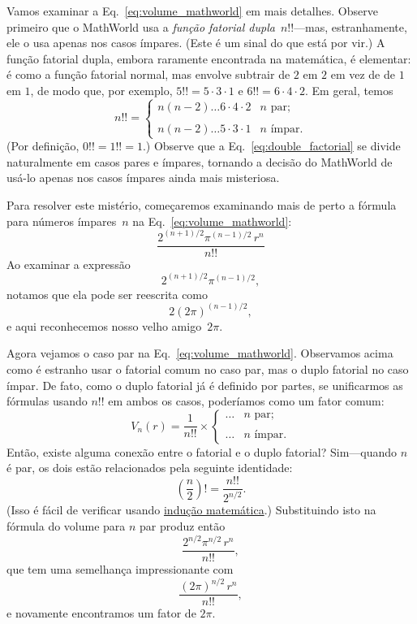 Vamos examinar a Eq.~\eqref{eq:volume_mathworld} em mais detalhes. Observe primeiro que o MathWorld usa a \emph{função fatorial dupla}~$n!!$---mas, estranhamente, ele o usa apenas nos casos ímpares. (Este é um sinal do que está por vir.) A função fatorial dupla, embora raramente encontrada na matemática, é elementar: é como a função fatorial normal, mas envolve subtrair de $2$ em $2$ em vez de de $1$ em $1$, de modo que, por exemplo, $5!! = 5 \cdot 3 \cdot 1$ e $6!! = 6 \cdot 4 \cdot 2$. Em geral, temos
\begin{equation}
\label{eq:double_factorial}
n!! = \begin{cases}
n(n-2)\ldots6\cdot4\cdot2 & n \text{ par}; \\ \\
n(n-2)\ldots5\cdot3\cdot1 & n \text{ ímpar}.
\end{cases}
\end{equation}
(Por definição, $0!! = 1!! = 1$.) Observe que a Eq.~\eqref{eq:double_factorial} se divide naturalmente em casos pares e ímpares, tornando a decisão do MathWorld de usá-lo apenas nos casos ímpares ainda mais misteriosa.

Para resolver este mistério, começaremos examinando mais de perto a fórmula para números ímpares~$n$ na Eq.~\eqref{eq:volume_mathworld}:
\[ \frac{2^{(n+1)/2}\pi^{(n-1)/2}\,r^n}{n!!} \]
Ao examinar a expressão
\[ 2^{(n+1)/2}\pi^{(n-1)/2}, \]
notamos que ela pode ser reescrita como
\[ 2(2\pi)^{(n-1)/2}, \]
e aqui reconhecemos nosso velho amigo~$2\pi$.

Agora vejamos o caso par na Eq.~\eqref{eq:volume_mathworld}. Observamos acima como é estranho usar o fatorial comum no caso par, mas o duplo fatorial no caso ímpar. De fato, como o duplo fatorial já é definido por partes, se unificarmos as fórmulas usando $n!!$ em ambos os casos, poderíamos  como um fator comum:
\[
V_n(r) = \frac{1}{n!!}\times \begin{cases}
\ldots & n \text{ par}; \\ \\
 \ldots & n \text{ ímpar}.
 \end{cases}
\]
Então, existe alguma conexão entre o fatorial e o duplo fatorial? Sim---quando $n$ é par, os dois estão relacionados pela seguinte identidade:
\[ \left(\frac{n}{2}\right)! = \frac{n!!}{2^{n/2}}. \]
(Isso é fácil de verificar usando \href{https://pt.wikipedia.org/wiki/Indu%C3%A7%C3%A3o_matem%C3%A1tica}{indução matemática}.) Substituindo isto na fórmula do volume para $n$ par produz então
\[ \frac{2^{n/2}\pi^{n/2}\,r^n}{n!!}, \]
que tem uma semelhança impressionante com
\[ \frac{(2\pi)^{n/2}\,r^n}{n!!}, \]
e novamente encontramos um fator de $2\pi$.

